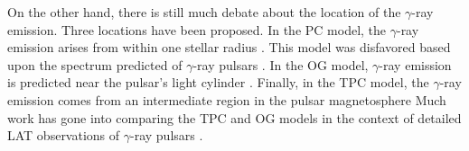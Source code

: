 On the other hand, there is still much debate about the location
of the $\gamma$-ray emission.  Three locations have been proposed.
In the \ac{PC} model, the $\gamma$-ray emission arises from within one
stellar radius \citep{daugherty_1996a_gamma-ray-pulsars:}.  This model
was disfavored based upon the spectrum predicted of $\gamma$-ray
pulsars \citep{abdo_2009b_fermi-large}.  In the \ac{OG} model,
$\gamma$-ray emission is predicted near the pulsar's light cylinder
\citep{cheng_1986a_energetic-radiation,romani_1996a_gamma-ray-pulsars:}.
Finally, in the \ac{TPC} model, the $\gamma$-ray emission
comes from an intermediate region in the pulsar magnetosphere
\citep{dyks_2003a_two-pole-caustic,muslimov_2004a_high-altitude-particle}
Much work has gone into comparing the \ac{TPC} and
\ac{OG} models in the context of detailed \ac{LAT}
observations of $\gamma$-ray pulsars \citep[See for
example][]{watters_2011a_galactic-population,romani_2011a_sub-luminous-gamma-ray}.
